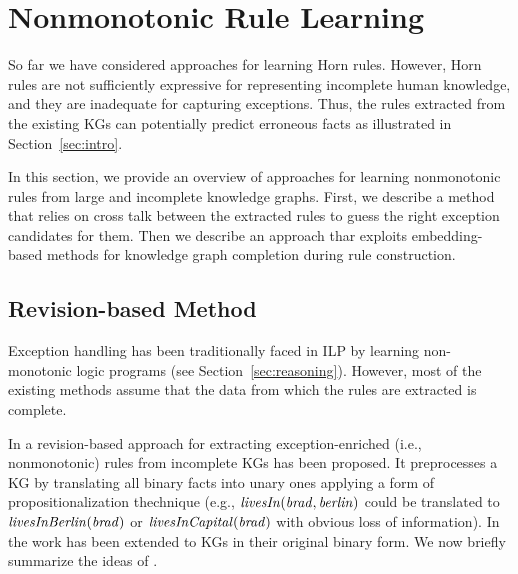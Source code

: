 \section{Nonmonotonic Rule Learning}\label{sec:nmrulelearn}
So far we have considered approaches for learning Horn rules. However,  Horn rules are not sufficiently expressive for representing incomplete human knowledge, and they are inadequate for capturing
exceptions. Thus, the rules extracted from the existing KGs can potentially %
predict erroneous facts as illustrated in Section~\ref{sec:intro}. 

In this section, we provide an overview of approaches for learning nonmonotonic rules from large and incomplete knowledge graphs. First, we describe a method that relies on cross talk between the extracted rules to guess the right exception candidates for them. Then we describe an approach thar exploits embedding-based methods for knowledge graph completion during rule construction.

\subsection{Revision-based Method}
Exception handling has been traditionally faced in ILP by learning non-monotonic logic programs \cite{DBLP:conf/ijcai/InoueK97,DBLP:journals/tocl/Sakama05,XHAIL,CorapiRL10,ILASP_system} (see Section~\ref{sec:reasoning}). However, most of the existing methods assume that the data from which the rules are extracted is complete.

In \cite{gad2016} a revision-based approach for extracting exception-enriched (i.e., nonmonotonic) rules from incomplete KGs has been proposed. 
It preprocesses a KG by translating all binary facts into unary ones applying a form of propositionalization thechnique \cite{propos} (e.g., $\mathit{livesIn(brad,berlin)}$ could be translated to $\mathit{livesInBerlin(brad)}$ or $\mathit{livesInCapital(brad)}$ with obvious loss of information). In \cite{rumis} the work has been extended to KGs in their original binary form. We now briefly summarize the ideas of  \cite{gad2016,rumis}.

